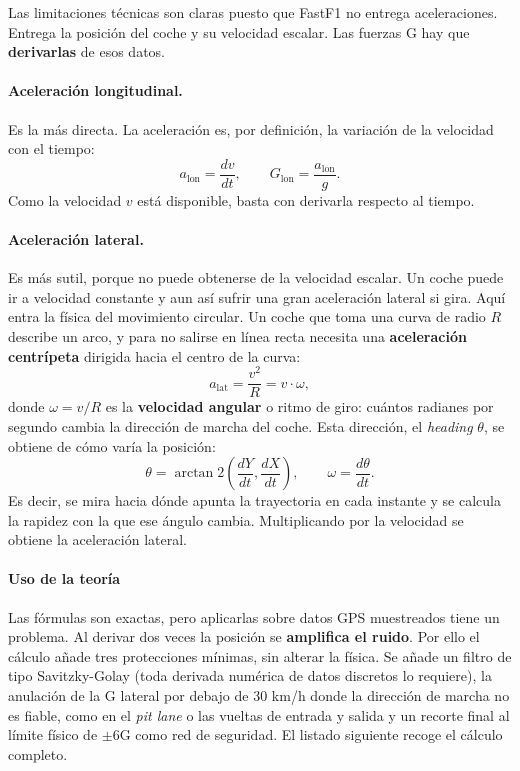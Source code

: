 \documentclass[12pt,a4paper,twoside,openright]{book}
\begin{document}
\noindent Las limitaciones técnicas son claras puesto que FastF1 no entrega aceleraciones. Entrega la posición del coche y su velocidad escalar. Las fuerzas G hay que \textbf{derivarlas} de esos datos.

\paragraph{Aceleración longitudinal.} Es la más directa. La aceleración es, por definición, la variación de la velocidad con el tiempo:
\begin{equation}
a_{\text{lon}} = \frac{dv}{dt}, \qquad G_{\text{lon}} = \frac{a_{\text{lon}}}{g}.
\end{equation}
\noindent Como la velocidad $v$ está disponible, basta con derivarla respecto al tiempo.

\paragraph{Aceleración lateral.} Es más sutil, porque no puede obtenerse de la velocidad escalar. Un coche puede ir a velocidad constante y aun así sufrir una gran aceleración lateral si gira. Aquí entra la física del movimiento circular. 
Un coche que toma una curva de radio $R$ describe un arco, y para no salirse en línea recta necesita una \textbf{aceleración centrípeta} dirigida hacia el centro de la curva:
\begin{equation}
a_{\text{lat}} = \frac{v^2}{R} = v \cdot \omega,
\end{equation}
donde $\omega = v/R$ es la \textbf{velocidad angular} o ritmo de giro: cuántos radianes por segundo cambia la dirección de marcha del coche. Esta dirección, el \textit{heading} $\theta$, se obtiene de cómo varía la posición:
\begin{equation}
\theta = \arctan\!2\!\left(\frac{dY}{dt}, \frac{dX}{dt}\right), \qquad \omega = \frac{d\theta}{dt}.
\end{equation}
Es decir, se mira hacia dónde apunta la trayectoria en cada instante y se calcula la rapidez con la que ese ángulo cambia. Multiplicando por la velocidad se obtiene la aceleración lateral.

\paragraph{Uso de la teoría}
Las fórmulas son exactas, pero aplicarlas sobre datos GPS muestreados tiene un problema. Al derivar dos veces la posición se \textbf{amplifica el ruido}. Por ello el cálculo añade tres protecciones mínimas, sin alterar la física. Se añade un filtro de tipo Savitzky-Golay (toda derivada numérica de datos discretos lo requiere), la anulación de la G lateral por debajo de 30 km/h donde la dirección de marcha no es fiable, como en el \textit{pit lane} o las vueltas de entrada y salida y un recorte final al límite físico de $\pm 6$G como red de seguridad. El listado siguiente recoge el cálculo completo.
\end{document}
